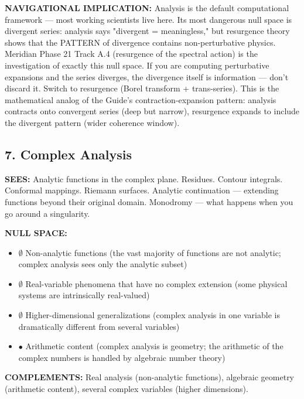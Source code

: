 \textbf{NAVIGATIONAL IMPLICATION:} Analysis is the default computational framework — most working scientists live here. Its most dangerous null space is divergent series: analysis says "divergent = meaningless," but resurgence theory shows that the PATTERN of divergence contains non-perturbative physics. Meridian Phase 21 Track A.4 (resurgence of the spectral action) is the investigation of exactly this null space. If you are computing perturbative expansions and the series diverges, the divergence itself is information — don't discard it. Switch to resurgence (Borel transform + trans-series). This is the mathematical analog of the Guide's contraction-expansion pattern: analysis contracts onto convergent series (deep but narrow), resurgence expands to include the divergent pattern (wider coherence window).


\bigskip\noindent\makebox[\textwidth]{\color{rulegray}\rule{5cm}{0.3pt}}\bigskip


\subsection*{7. Complex Analysis}


\textbf{SEES:} Analytic functions in the complex plane. Residues. Contour integrals. Conformal mappings. Riemann surfaces. Analytic continuation — extending functions beyond their original domain. Monodromy — what happens when you go around a singularity.


\textbf{NULL SPACE:}

\begin{itemize}[nosep,leftmargin=*]
  \item $\emptyset$ Non-analytic functions (the vast majority of functions are not analytic; complex analysis sees only the analytic subset)
  \item $\emptyset$ Real-variable phenomena that have no complex extension (some physical systems are intrinsically real-valued)
  \item $\emptyset$ Higher-dimensional generalizations (complex analysis in one variable is dramatically different from several variables)
  \item $\bullet$ Arithmetic content (complex analysis is geometry; the arithmetic of the complex numbers is handled by algebraic number theory)
\end{itemize}


\textbf{COMPLEMENTS:} Real analysis (non-analytic functions), algebraic geometry (arithmetic content), several complex variables (higher dimensions).


